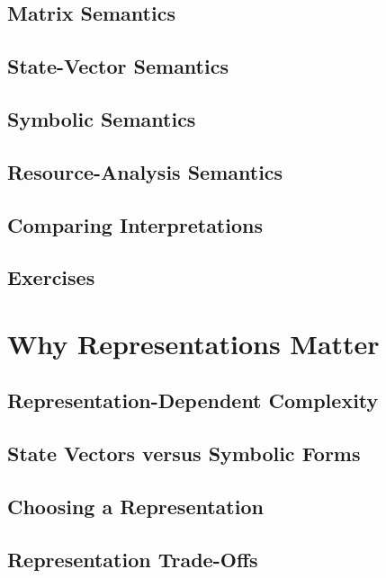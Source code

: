\documentclass[11pt,a4paper]{article}
\begin{document}
\subsection{Matrix Semantics}

\subsection{State-Vector Semantics}

\subsection{Symbolic Semantics}

\subsection{Resource-Analysis Semantics}

\subsection{Comparing Interpretations}

\subsection{Exercises}


\section{Why Representations Matter}

\subsection{Representation-Dependent Complexity}

\subsection{State Vectors versus Symbolic Forms}

\subsection{Choosing a Representation}

\subsection{Representation Trade-Offs}
\end{document}
